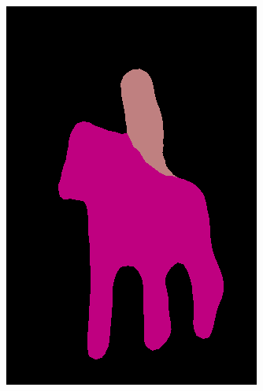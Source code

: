 \documentclass{article} %
\begin{document}
\begin{figure}[t]
\begin{subfigure}[b]{0.19\linewidth}
    \includegraphics[width=\textwidth]{figs/ab/deeplab/2007_005331}
  \end{subfigure}
  \begin{subfigure}[b]{0.19\linewidth}

\end{subfigure}
\end{figure}
\end{document}
